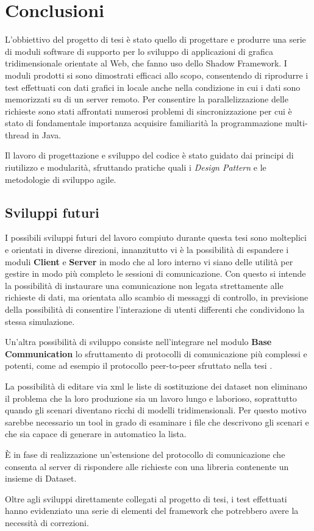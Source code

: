 
\chapter{Conclusioni}
\label{ch:conclusioni}
L'obbiettivo del progetto di tesi \`e stato quello di progettare e produrre una serie di moduli software di supporto per lo sviluppo di applicazioni di grafica tridimensionale orientate al Web, che fanno uso dello Shadow Framework. I moduli prodotti si sono dimostrati efficaci allo scopo, consentendo di riprodurre i test effettuati con dati grafici in locale anche nella condizione in cui i dati sono memorizzati su di un server remoto. 
Per consentire la parallelizzazione delle richieste sono stati affrontati numerosi problemi di sincronizzazione per cui \`e stato di fondamentale importanza acquisire familiarit\`a la programmazione multi-thread in Java.


Il lavoro di progettazione e sviluppo del codice \`e stato guidato dai principi di riutilizzo e modularit\`a, sfruttando pratiche quali i \textit{Design Pattern} e le metodologie di sviluppo agile.



\section{Sviluppi futuri}
I possibili sviluppi futuri del lavoro compiuto durante questa tesi sono molteplici e orientati in diverse direzioni, innanzitutto vi \`e la possibilit\`a di espandere i moduli \textbf{Client} e \textbf{Server} in modo che al loro interno vi siano delle utilit\`a per gestire in modo pi\`u completo le sessioni di comunicazione. Con questo si intende la possibilit\`a di instaurare una comunicazione non legata strettamente alle richieste di dati, ma orientata allo scambio di messaggi di controllo, in previsione della possibilit\`a di consentire l'interazione di utenti differenti che condividono la stessa simulazione.

Un'altra possibilit\`a di sviluppo consiste nell'integrare nel modulo \textbf{Base Communication} lo sfruttamento di protocolli di comunicazione pi\`u complessi e potenti, come ad esempio il protocollo peer-to-peer sfruttato nella tesi \cite{tesi:truzzi}.

La possibilit\`a di editare via xml le liste di sostituzione dei dataset non eliminano il problema che la loro produzione sia un lavoro lungo e laborioso, soprattutto quando gli scenari diventano ricchi di modelli tridimensionali. Per questo motivo sarebbe necessario un tool in grado di esaminare i file che descrivono gli scenari e che sia capace di generare in automatico la lista.

\`E in fase di realizzazione un'estensione del protocollo di comunicazione che consenta al server di rispondere alle richieste con una libreria contenente un insieme di Dataset.

Oltre agli sviluppi direttamente collegati al progetto di tesi, i test effettuati hanno evidenziato una serie di elementi del framework che potrebbero avere la necessit\`a di correzioni.

